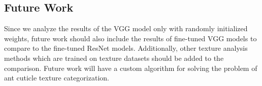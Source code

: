 \documentclass[12pt]{article}
\begin{document}
\subsection{Future Work}

Since we analyze the results of the VGG model only with randomly initialized
weights, future work should also include the results of fine-tuned VGG models to
compare to the fine-tuned ResNet models. Additionally, other texture analysis
methods which are trained on texture datasets should be added to the comparison.
Future work will have a custom algorithm for solving the problem of ant cuticle
texture categorization.

\newpage
\printbibliography[heading=bibintoc,title={REFERENCES}]
\end{document}
